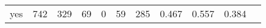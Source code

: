\begin{longtable}{lp{1.10cm}p{1.10cm}p{1.10cm}p{1.10cm}p{1.10cm}p{1.10cm}p{1.10cm}p{1.10cm}p{1.10cm}p{1.10cm}}
yes       &                    742 &                                329 &                                69 &                                0 &                                59 &                             285 &                          0.467 &                                 0.557 &                               0.384 \\
\end{longtable}
